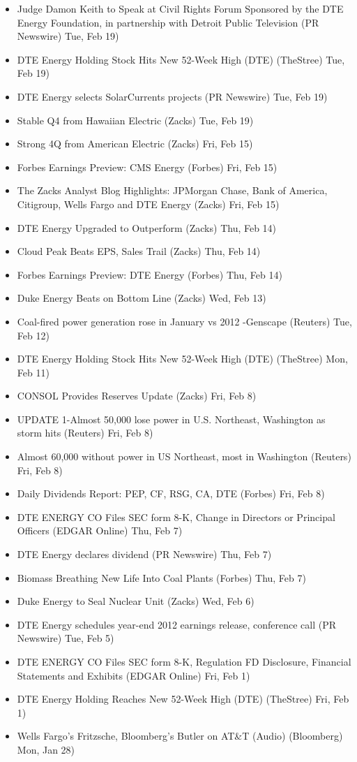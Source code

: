 \documentclass[11pt,asymmetric]{article}
\begin{document}
\begin{itemize}
\item Judge Damon Keith to Speak at Civil Rights Forum Sponsored by the DTE Energy Foundation, in partnership with Detroit Public Television (PR Newswire) Tue, Feb 19)
\item DTE Energy Holding Stock Hits New 52-Week High (DTE) (TheStree) Tue, Feb 19)
\item DTE Energy selects SolarCurrents projects (PR Newswire) Tue, Feb 19)
\item Stable Q4 from Hawaiian Electric (Zacks) Tue, Feb 19)
\item Strong 4Q from American Electric (Zacks) Fri, Feb 15)
\item Forbes Earnings Preview: CMS Energy (Forbes) Fri, Feb 15)
\item The Zacks Analyst Blog Highlights: JPMorgan Chase, Bank of America, Citigroup, Wells Fargo and DTE Energy (Zacks) Fri, Feb 15)
\item DTE Energy Upgraded to Outperform (Zacks) Thu, Feb 14)
\item Cloud Peak Beats EPS, Sales Trail (Zacks) Thu, Feb 14)
\item Forbes Earnings Preview: DTE Energy (Forbes) Thu, Feb 14)
\item Duke Energy Beats on Bottom Line (Zacks) Wed, Feb 13)
\item Coal-fired power generation rose in January vs 2012 -Genscape (Reuters) Tue, Feb 12)
\item DTE Energy Holding Stock Hits New 52-Week High (DTE) (TheStree) Mon, Feb 11)
\item CONSOL Provides Reserves Update (Zacks) Fri, Feb 8)
\item UPDATE 1-Almost 50,000 lose power in U.S. Northeast, Washington as storm hits (Reuters) Fri, Feb 8)
\item Almost 60,000 without power in US Northeast, most in Washington (Reuters) Fri, Feb 8)
\item Daily Dividends Report: PEP, CF, RSG, CA, DTE (Forbes) Fri, Feb 8)
\item DTE ENERGY CO Files SEC form 8-K, Change in Directors or Principal Officers (EDGAR Online) Thu, Feb 7)
\item DTE Energy declares dividend (PR Newswire) Thu, Feb 7)
\item Biomass Breathing New Life Into Coal Plants (Forbes) Thu, Feb 7)
\item Duke Energy to Seal Nuclear Unit (Zacks) Wed, Feb 6)
\item DTE Energy schedules year-end 2012 earnings release, conference call (PR Newswire) Tue, Feb 5)
\item DTE ENERGY CO Files SEC form 8-K, Regulation FD Disclosure, Financial Statements and Exhibits (EDGAR Online) Fri, Feb 1)
\item DTE Energy Holding Reaches New 52-Week High (DTE) (TheStree) Fri, Feb 1)
\item Wells Fargo's Fritzsche, Bloomberg's Butler on AT\&T (Audio) (Bloomberg) Mon, Jan 28)
\end{itemize}
\end{document}
